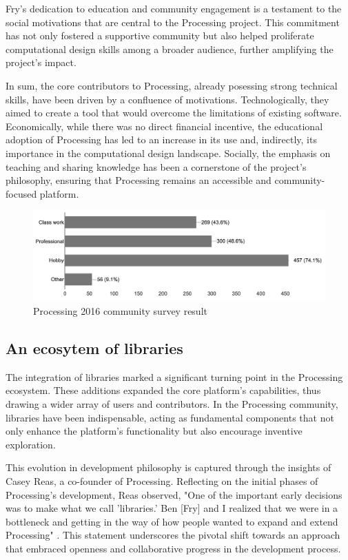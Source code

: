 Fry’s dedication to education and community engagement is a testament to the social motivations that are central to the Processing project. This commitment has not only fostered a supportive community but also helped proliferate computational design skills among a broader audience, further amplifying the project's impact.

In sum, the core contributors to Processing, already posessing strong technical skills, have been driven by a confluence of motivations. Technologically, they aimed to create a tool that would overcome the limitations of existing software. Economically, while there was no direct financial incentive, the educational adoption of Processing has led to an increase in its use and, indirectly, its importance in the computational design landscape. Socially, the emphasis on teaching and sharing knowledge has been a cornerstone of the project’s philosophy, ensuring that Processing remains an accessible and community-focused platform.

\begin{figure}[h!]
	\centering
	\includegraphics[width=\textwidth]{images/community-survey.png}
	\caption{Processing 2016 community survey result \parencite{2016CommunitySurvey}}
	\label{fig:community_survey}
\end{figure}

\subsection{An ecosytem of libraries}
The integration of libraries marked a significant turning point in the Processing ecosystem. These additions expanded the core platform's capabilities, thus drawing a wider array of users and contributors. In the Processing community, libraries have been indispensable, acting as fundamental components that not only enhance the platform’s functionality but also encourage inventive exploration.

This evolution in development philosophy is captured through the insights of Casey Reas, a co-founder of Processing. Reflecting on the initial phases of Processing's development, Reas observed, "One of the important early decisions was to make what we call 'libraries.' Ben [Fry] and I realized that we were in a bottleneck and getting in the way of how people wanted to expand and extend Processing" \parencite[329]{conradGraphicDesignPostdigital2021}. This statement underscores the pivotal shift towards an approach that embraced openness and collaborative progress in the development process.

